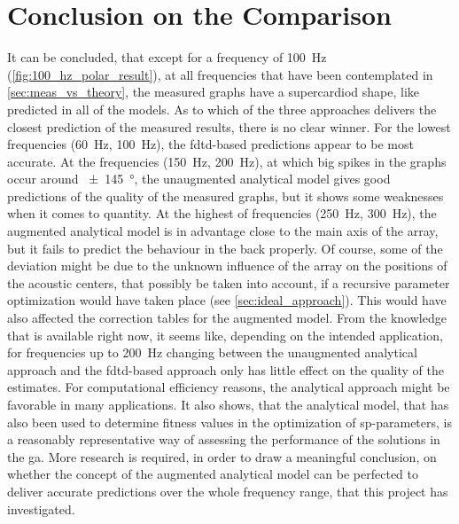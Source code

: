\section{Conclusion on the Comparison}\label{meas_vs_theory_conclusion}
It can be concluded, that except for a frequency of \SI{100}{\hertz} (\autoref{fig:100_hz_polar_result}), at all frequencies that have been contemplated in \autoref{sec:meas_vs_theory}, the measured graphs have a supercardiod shape, like predicted in all of the models. As to which of the three approaches delivers the closest prediction of the measured results, there is no clear winner. For the lowest frequencies (\SI{60}{\hertz}, \SI{100}{\hertz}), the \gls{fdtd}-based predictions appear to be most accurate. At the frequencies (\SI{150}{\hertz}, \SI{200}{\hertz}), at which big spikes in the graphs occur around \SI{\pm 145}{\degree}, the unaugmented analytical model gives good predictions of the quality of the measured graphs, but it shows some weaknesses when it comes to quantity. At the highest of frequencies (\SI{250}{\hertz}, \SI{300}{\hertz}), the augmented analytical model is in advantage close to the main axis of the array, but it fails to predict the behaviour in the back properly. Of course, some of the deviation might be due to the unknown influence of the array on the positions of the acoustic centers, that possibly be taken into account, if a recursive parameter optimization would have taken place (see \autoref{sec:ideal_approach}). This would have also affected the correction tables for the augmented model. From the knowledge that is available right now, it seems like, depending on the intended application, for frequencies up to \SI{200}{\hertz} changing between the unaugmented analytical approach and the \gls{fdtd}-based approach only has little effect on the quality of the estimates. For computational efficiency reasons, the analytical approach might be favorable in many applications. It also shows, that the analytical model, that has also been used to determine fitness values in the optimization of \gls{sp}-parameters, is a reasonably representative way of assessing the performance of the solutions in the \gls{ga}. More research is required, in order to draw a meaningful conclusion, on whether the concept of the augmented analytical model can be perfected to deliver accurate predictions over the whole frequency range, that this project has investigated.
